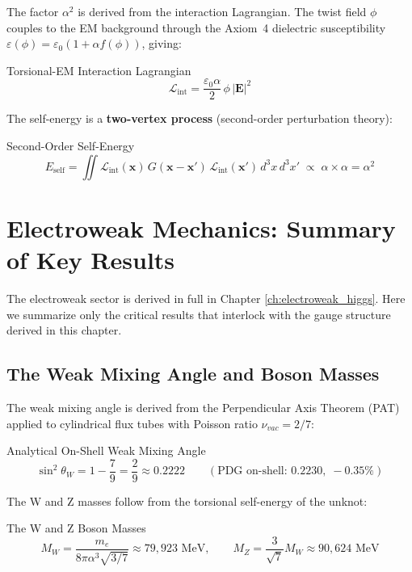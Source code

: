 The factor $\alpha^2$ is derived from the interaction Lagrangian. The twist field $\phi$ couples to the EM background through the Axiom~4 dielectric susceptibility $\varepsilon(\phi) = \varepsilon_0(1 + \alpha f(\phi))$, giving:
\begin{resultbox}{Torsional-EM Interaction Lagrangian}
\begin{equation}
    \mathcal{L}_{\text{int}} = \frac{\varepsilon_0 \alpha}{2}\,\phi\,|\mathbf{E}|^2
\end{equation}
\end{resultbox}
The self-energy is a \textbf{two-vertex process} (second-order perturbation theory):
\begin{resultbox}{Second-Order Self-Energy}
\begin{equation}
    E_{\text{self}} = \iint \mathcal{L}_{\text{int}}(\mathbf{x})\, G(\mathbf{x}-\mathbf{x}')\, \mathcal{L}_{\text{int}}(\mathbf{x}')\, d^3x\, d^3x' \;\propto\; \alpha \times \alpha = \alpha^2
\end{equation}
\end{resultbox}
\section{Electroweak Mechanics: Summary of Key Results}

The electroweak sector is derived in full in Chapter \ref{ch:electroweak_higgs}. Here we summarize only the critical results that interlock with the gauge structure derived in this chapter.

\subsection{The Weak Mixing Angle and Boson Masses}
The weak mixing angle is derived from the Perpendicular Axis Theorem (PAT) applied to cylindrical flux tubes with Poisson ratio $\nu_{vac} = 2/7$:
\begin{resultbox}{Analytical On-Shell Weak Mixing Angle}
\begin{equation}
    \sin^2\theta_W = 1 - \frac{7}{9} = \frac{2}{9} \approx 0.2222 \qquad (\text{PDG on-shell: } 0.2230, \; -0.35\%)
\end{equation}
\end{resultbox}

The W and Z masses follow from the torsional self-energy of the unknot:
\begin{resultbox}{The W and Z Boson Masses}
\begin{equation}
    M_W = \frac{m_e}{8\pi\alpha^3\sqrt{3/7}} \approx 79{,}923 \text{ MeV}, \qquad M_Z = \frac{3}{\sqrt{7}}M_W \approx 90{,}624 \text{ MeV}
\end{equation}
\end{resultbox}

